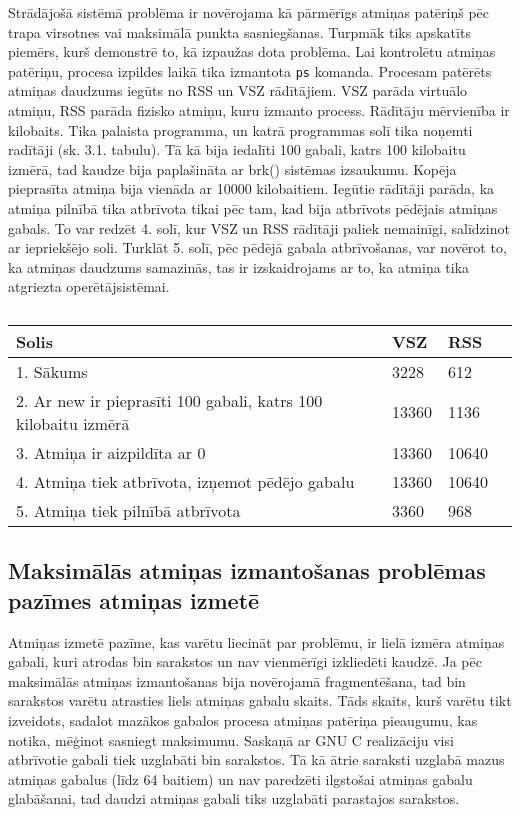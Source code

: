 Strādājošā sistēmā problēma ir novērojama kā pārmērīgs atmiņas patēriņš pēc trapa virsotnes vai maksimālā punkta sasniegšanas.
Turpmāk tiks apskatīts piemērs, kurš demonstrē to, kā izpaužas dota problēma.
Lai kontrolētu atmiņas patēriņu, procesa izpildes laikā tika izmantota \texttt{ps} komanda.
Procesam patērēts atmiņas daudzums iegūts no RSS un VSZ rādītājiem.
VSZ parāda virtuālo atmiņu, RSS parāda fizisko atmiņu, kuru izmanto process.
Rādītāju mērvienība ir kilobaits.
Tika palaista programma, un katrā programmas solī tika noņemti radītāji (sk. 3.1. tabulu).
Tā kā bija iedalīti 100 gabali, katrs 100 kilobaitu izmērā, tad kaudze bija paplašināta ar brk() sistēmas izsaukumu.
Kopēja pieprasīta atmiņa bija vienāda ar 10000 kilobaitiem.
Iegūtie rādītāji parāda, ka atmiņa pilnībā tika atbrīvota tikai pēc tam, kad bija atbrīvots pēdējais atmiņas gabals.
To var redzēt 4. solī, kur VSZ un RSS rādītāji paliek nemainīgi, salīdzinot ar iepriekšējo soli.
Turklāt 5. solī, pēc pēdējā gabala atbrīvošanas, var novērot to, ka atmiņas daudzums samazinās, tas ir izskaidrojams ar to, ka atmiņa tika atgriezta operētājsistēmai.


\begin{table}[H]
\caption{\textbf{\fontsize{11}{12}\selectfont {Programmas RSS un VSZ radītāji}}}
\label{table:kysymys}
\centering
	\begin{tabular}{|l|l|l|p{5cm}|}
	  \hline
	Solis & VSZ & RSS \\
    \hline
    1. Sākums & 3228 & 612 \\
	\hline
	 2. Ar new ir pieprasīti 100 gabali, katrs 100 kilobaitu izmērā  & 13360  & 1136 \\
      \hline
     3. Atmiņa ir aizpildīta ar 0 &  13360 & 10640\\
      \hline
     4. Atmiņa tiek atbrīvota, izņemot pēdējo gabalu & 13360 & 10640 \\
      \hline
     5. Atmiņa tiek pilnībā atbrīvota & 3360 & 968 \\
    \hline
	\end{tabular}
\end{table}


\subsection{Maksimālās atmiņas izmantošanas problēmas pazīmes atmiņas izmetē}
Atmiņas izmetē pazīme, kas varētu liecināt par problēmu, ir lielā izmēra atmiņas gabali, kuri atrodas bin sarakstos un nav vienmērīgi  izkliedēti kaudzē.
Ja pēc maksimālās atmiņas izmantošanas bija novērojamā fragmentēšana, tad bin sarakstos varētu atrasties liels atmiņas gabalu skaits.
Tāds skaits, kurš varētu tikt izveidots, sadalot mazākos gabalos procesa atmiņas patēriņa pieaugumu, kas notika, mēģinot sasniegt maksimumu.
Saskaņā ar GNU C realizāciju visi atbrīvotie gabali tiek uzglabāti bin sarakstos.
Tā kā ātrie saraksti uzglabā mazus atmiņas gabalus (līdz 64 baitiem) un nav paredzēti ilgstošai atmiņas gabalu glabāšanai, tad daudzi atmiņas gabali tiks uzglabāti parastajos sarakstos.


